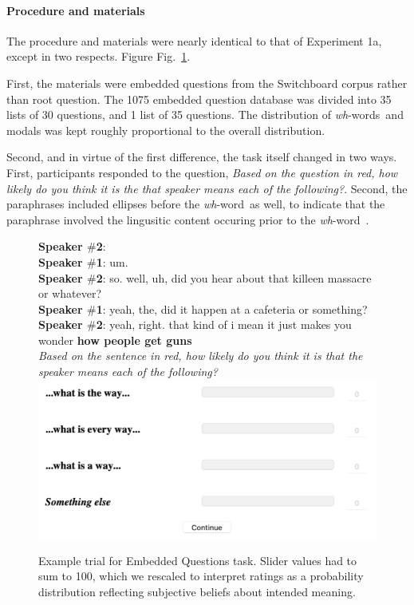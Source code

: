 \documentclass[12pt,letterpaper,table,svgnames,dvipsnames]{article}
\newcommand{\figref}[1]{Fig.~\ref{#1}}
\newcommand{\whw}{\emph{wh}-word~}
\newcommand{\whws}{\emph{wh}-words~}
\begin{document}
\paragraph{Procedure and materials}
The procedure and materials were nearly identical to that of Experiment 1a, except in two respects. Figure \figref{trial-ex1b}.

First, the materials were embedded questions from the Switchboard corpus rather than root question. The 1075 embedded question database was divided into 35 lists of 30 questions, and 1 list of 35 questions. The distribution of \whws and modals was kept roughly proportional to the overall distribution.

Second, and in virtue of the first difference, the task itself changed in two ways. First, participants responded to the question, \emph{Based on the question in red, how likely do you think it is the that speaker means each of the following?}. Second, the paraphrases included ellipses before the \whw as well, to indicate that the paraphrase involved the lingusitic content occuring prior to the \whw.

\begin{figure}%
\begin{tcolorbox}[colback=white]

\textbf{Speaker $\#$2}: \\
\textbf{Speaker $\#$1}: um.\\
\textbf{Speaker $\#$2}: so. well, uh, did you hear about that killeen massacre or whatever?\\
\textbf{Speaker $\#$1}: yeah, the, did it happen at a cafeteria or something?\\
\textbf{Speaker $\#$2}: yeah, right. that kind of i mean it just makes \color{red}you wonder \textbf{how people get guns}\color{black}\\

\noindent \emph{Based on the sentence in red, how likely do you think it is that the speaker means each of the following?}\\

\includegraphics[scale=.5]{figures/sliders_eq.png}
\end{tcolorbox}
\caption{Example trial for Embedded Questions task. Slider values had to sum to 100, which we rescaled to interpret ratings as a probability distribution reflecting subjective beliefs about intended meaning.}
\label{trial-ex1b}
\end{figure}
\end{document}
